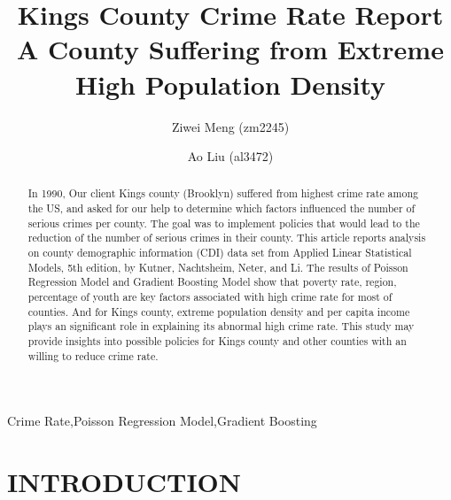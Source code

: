\documentclass[preprint,12pt,3p]{elsarticle}
\begin{document}
\begin{frontmatter}

\title{\textbf{Kings County Crime Rate Report}\\
A County Suffering from Extreme High Population Density
}

\author{Ziwei Meng (zm2245)}
\author{Ao Liu (al3472)}



\begin{abstract}
  \indent
  In 1990, Our client Kings county (Brooklyn) suffered from highest crime rate among the US, and asked for our help to determine which factors influenced the number of serious crimes per county. The goal was to implement policies that would lead to the reduction of the number of serious crimes in their county.
  \bigbreak
  This article reports analysis on county demographic information (CDI) data set from Applied Linear Statistical Models, 5th edition, by Kutner, Nachtsheim, Neter, and Li. The results of Poisson Regression Model and Gradient Boosting Model show that poverty rate, region, percentage of youth are key factors associated with high crime rate for most of counties. And for Kings county, extreme population density and per capita income plays an significant role in explaining its abnormal high crime rate.
  \bigbreak
  This study may provide insights into possible policies for Kings county and other counties with an willing to reduce crime rate.
\end{abstract}

\begin{keyword}
Crime Rate\sep Poisson Regression Model\sep Gradient Boosting
\end{keyword}

\end{frontmatter}


\section{INTRODUCTION}
\label{sec1}
\end{document}

